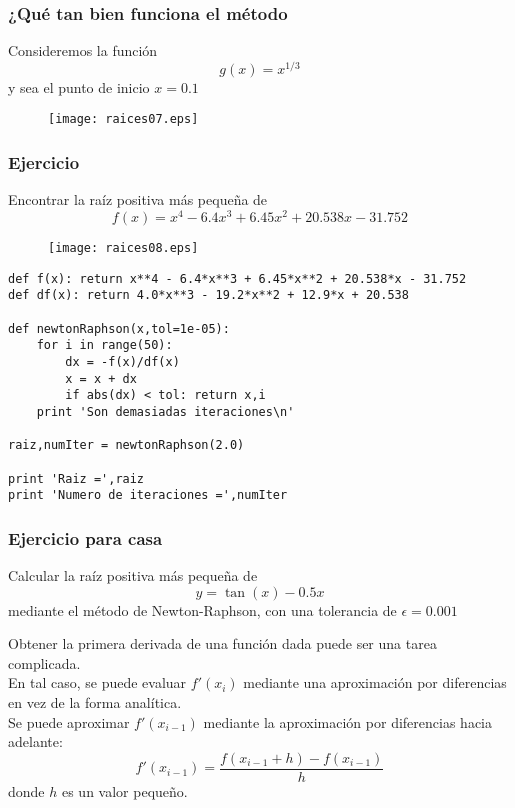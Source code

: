 \begin{frame}
\frametitle{¿Qu\'{e} tan bien funciona el m\'{e}todo}
Consideremos la funci\'{o}n
\[ g(x) = x^{1/3} \]
y sea el punto de inicio $x=0.1$
\begin{figure}
	\centering
	 {\texttt{[image: raices07.eps]}}
\end{figure}
\end{frame}
\begin{frame}
\frametitle{Ejercicio}
Encontrar la ra\'{i}z positiva m\'{a}s pequeña de
\[ f(x) = x^{4} - 6.4 x^{3} + 6.45x^{2} + 20.538x - 31.752\]
\begin{figure}
	\centering
	 {\texttt{[image: raices08.eps]}}
\end{figure}
\end{frame}
\begin{frame}[fragile]
\begin{lstlisting}
def f(x): return x**4 - 6.4*x**3 + 6.45*x**2 + 20.538*x - 31.752
def df(x): return 4.0*x**3 - 19.2*x**2 + 12.9*x + 20.538

def newtonRaphson(x,tol=1e-05):
    for i in range(50):
        dx = -f(x)/df(x)
        x = x + dx
        if abs(dx) < tol: return x,i
    print 'Son demasiadas iteraciones\n'

raiz,numIter = newtonRaphson(2.0)

print 'Raiz =',raiz
print 'Numero de iteraciones =',numIter
\end{lstlisting}
\end{frame}
\begin{frame}
\frametitle{Ejercicio para casa}
Calcular la ra\'{i}z positiva m\'{a}s pequeña de
\[y = \tan(x) - 0.5 x\]
mediante el m\'{e}todo de Newton-Raphson, con una tolerancia de $\epsilon=0.001$
\end{frame}
\begin{frame}
Obtener la primera derivada de una funci\'{o}n dada puede ser una tarea complicada.
\\
\bigskip
En tal caso, se puede evaluar $f'(x_{i})$ mediante una aproximaci\'{o}n por diferencias en vez de la forma anal\'{i}tica.
\\
\bigskip
Se puede aproximar $f'(x_{i-1})$ mediante la aproximaci\'{o}n por diferencias hacia adelante:
\[ f'(x_{i-1}) = \dfrac{f(x_{i-1}+h) - f(x_{i-1})}{h}\]
donde $h$ es un valor pequeño.
\end{frame}
